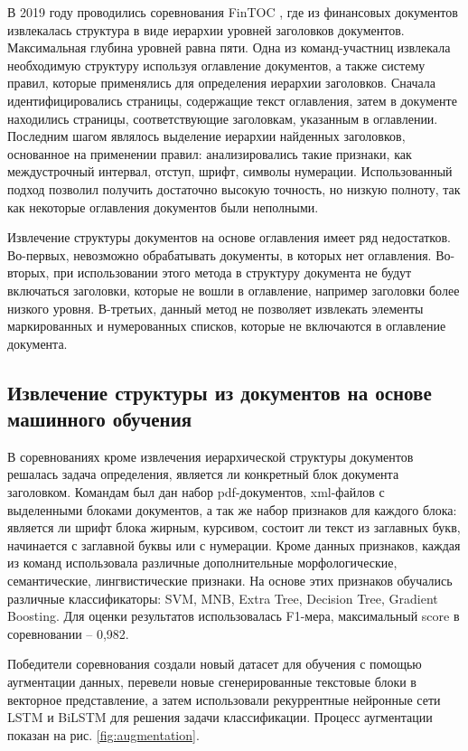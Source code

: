 \documentclass{ProcISPRAS}
\begin{document}
В 2019 году проводились соревнования FinTOC \cite{fintoc19comp}, где из финансовых документов извлекалась структура в виде иерархии уровней заголовков документов. Максимальная глубина уровней равна пяти. Одна из команд-участниц \cite{fintoc19daniel} извлекала необходимую структуру используя оглавление документов, а также систему правил, которые применялись для определения иерархии заголовков.
Сначала идентифицировались страницы, содержащие текст оглавления, затем в документе находились страницы, соответствующие заголовкам, указанным в оглавлении. 
Последним шагом являлось выделение иерархии найденных заголовков, основанное на применении правил: анализировались такие признаки, как междустрочный интервал, отступ, шрифт, символы нумерации.
Использованный подход позволил получить достаточно высокую точность, но низкую полноту, так как некоторые оглавления документов были неполными.

Извлечение структуры документов на основе оглавления имеет ряд недостатков. Во-первых, невозможно обрабатывать документы, в которых нет оглавления. Во-вторых, при использовании этого метода в структуру документа не будут включаться заголовки, которые не вошли в оглавление, например заголовки более низкого уровня. В-третьих, данный метод не позволяет извлекать элементы маркированных и нумерованных списков, которые не включаются в оглавление документа.

\subsection{Извлечение структуры из документов на основе машинного обучения}

В соревнованиях \cite{fintoc19comp} кроме извлечения иерархической структуры документов решалась задача определения, является ли конкретный блок документа заголовком. Командам был дан набор pdf-документов, xml-файлов с выделенными блоками документов, а так же набор признаков для каждого блока: является ли шрифт блока жирным, курсивом, состоит ли текст из заглавных букв, начинается с заглавной буквы или с нумерации. Кроме данных признаков, каждая из команд использовала различные дополнительные морфологические, семантические, лингвистические признаки. На основе этих признаков обучались различные классификаторы: SVM, MNB, Extra Tree, Decision Tree, Gradient Boosting. Для оценки результатов использовалась F1-мера, максимальный score в соревновании -- 0,982.

Победители соревнования \cite{fintoc19tian} создали новый датасет для обучения с помощью аугментации данных, перевели новые сгенерированные текстовые блоки в векторное представление, а затем использовали рекуррентные нейронные сети LSTM и BiLSTM для решения задачи классификации. Процесс аугментации показан на рис. \ref{fig:augmentation}.
\end{document}
